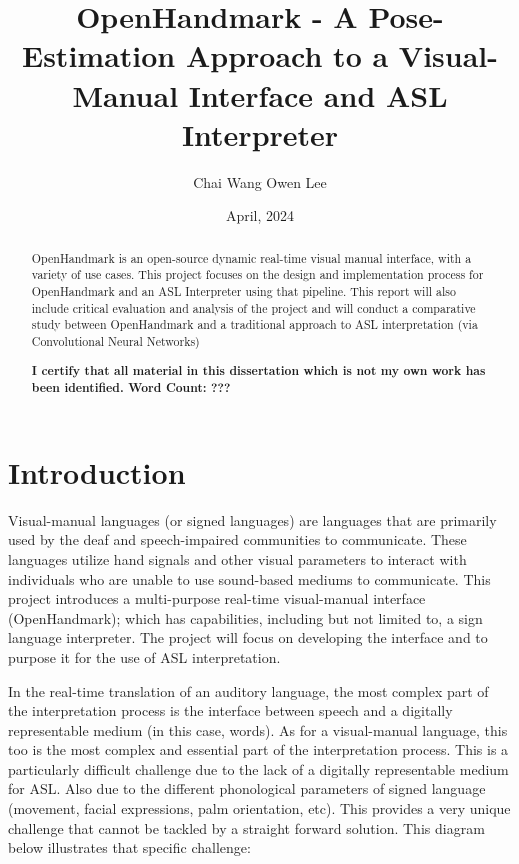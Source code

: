 \documentclass[11pt]{article}
\begin{document}
\title{OpenHandmark - A Pose-Estimation Approach to a Visual-Manual Interface and ASL Interpreter}
\author{Chai Wang Owen Lee}

\date{April, 2024}
\maketitle

\begin{abstract}
    OpenHandmark is an open-source dynamic real-time visual manual interface, with a variety of use cases. This project focuses on the design and implementation process for OpenHandmark and an ASL Interpreter using that pipeline. This report will also include critical evaluation and analysis of the project and will conduct a comparative study between OpenHandmark and a traditional approach to ASL interpretation (via Convolutional Neural Networks)
    \vspace*{\fill}

    \noindent 
    \textbf{I certify that all material in this dissertation which is not my own work has been identified. Word Count: ???}
\end{abstract}

\pagebreak
{}
\begingroup
  \flushbottom
  \setlength{\parskip}{0pt plus 1fil}%
  \tableofcontents
  \newpage
\endgroup

\pagebreak
\section{Introduction}
    Visual-manual languages (or signed languages) are languages that are primarily used by the deaf and speech-impaired communities to communicate. These languages utilize hand signals and other visual parameters to interact with individuals who are unable to use sound-based mediums to communicate. This project introduces a multi-purpose real-time visual-manual interface (OpenHandmark); which has capabilities, including but not limited to, a sign language interpreter. The project will focus on developing the interface and to purpose it for the use of ASL interpretation.
    
    In the real-time translation of an auditory language, the most complex part of the interpretation process is the interface between speech and a digitally representable medium (in this case, words). As for a visual-manual language, this too is the most complex and essential part of the interpretation process. This is a particularly difficult challenge due to the lack of a digitally representable medium for ASL. Also due to the different phonological parameters of signed language (movement, facial expressions, palm orientation, etc). This provides a very unique challenge that cannot be tackled by a straight forward solution. This diagram below illustrates that specific challenge:
\end{document}
